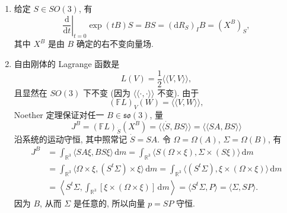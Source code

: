 \begin{description}[font=\normalfont,leftmargin=2em,labelwidth=1.5em]
\begin{enumerate}[label=(\alph*),ref=\alph*,leftmargin=*]
\item 给定 $S\in SO(3)$, 有
\[
  \left.\frac{\mathrm{d}}{\mathrm{d}t}\right|_{t=0}\exp(tB)S
  =BS=(\mathrm{d}R_S)_IB=(X^B)_S,
\]
其中 $X^B$ 是由 $B$ 确定的右不变向量场.
\item 自由刚体的 Lagrange 函数是
\[
  L(V)=\frac12\langle\!\langle V,V\rangle\!\rangle,
\]
且显然在 $SO(3)$ 下不变 (因为 $\langle\!\langle\cdot,\cdot\rangle\!\rangle$ 不变). 由于
\[
  (\mathbb FL)_V(W)=\langle\!\langle V,W\rangle\!\rangle,
\]
Noether 定理保证对任一 $B\in\mathfrak{so}(3)$, 量
\[
  J^B=(\mathbb FL)_{\dot S}(X^B)
      =\langle\!\langle\dot S,BS\rangle\!\rangle=\langle\!\langle SA,BS\rangle\!\rangle
\]
沿系统的运动守恒, 其中照常记 $\dot S=SA$. 令 $\Omega=\Omega(A)$, $\Sigma=\Omega(B)$, 有
\begin{align*}
  J^B&=\int_{\mathbb{R}^3}\langle SA\xi,BS\xi\rangle\,\mathrm{d}m
      =\int_{\mathbb{R}^3}\langle S(\Omega\times\xi),\Sigma\times(S\xi)\rangle\,\mathrm{d}m\\
     &=\int_{\mathbb{R}^3}\langle\Omega\times\xi,(S^t\Sigma)\times\xi\rangle\,\mathrm{d}m
      =\int_{\mathbb{R}^3}\langle(S^t\Sigma),\xi\times(\Omega\times\xi)\rangle\,\mathrm{d}m\\
     &=\left\langle S^t\Sigma,\int_{\mathbb{R}^3}[\xi\times(\Omega\times\xi)]\,\mathrm{d}m\right\rangle
      =\langle S^t\Sigma,P\rangle=\langle\Sigma,SP\rangle.
\end{align*}
因为 $B$, 从而 $\Sigma$ 是任意的, 所以向量 $p=SP$ 守恒.
\end{enumerate}
\end{description}
